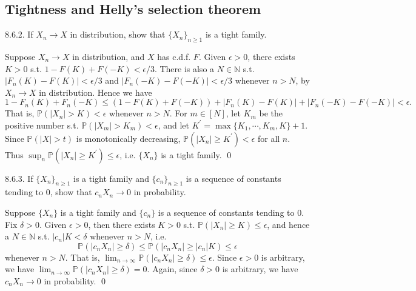 \subsection{Tightness and Helly’s selection theorem}
\begin{exercise}8.6.2. If $X_n\rightarrow X$ in distribution, show that $\{X_n\}_{n\geq1}$ is a tight family.
\end{exercise}
\begin{answer}
Suppose $X_n\rightarrow X$ in distribution, and $X$ has c.d.f. $F$. Given $\epsilon>0$, there exists $K>0$ s.t. $1-F(K)+F(-K)<\epsilon/3$. There is also a $N\in\mathbb{N}$ s.t. $|F_n(K)-F(K)|<\epsilon/3$ and $|F_n(-K)-F(-K)|<\epsilon/3$ whenever $n>N$, by $X_n\rightarrow X$ in distribution. Hence we have
\begin{equation*}
    1-F_n(K)+F_n(-K)\leq (1-F(K)+F(-K))+|F_n(K)-F(K)|+|F_n(-K)-F(-K)|<\epsilon.
\end{equation*}
That is, $\mathbb{P}(|X_n|>K)<\epsilon$ whenever $n>N$. For $m\in[N]$, let $K_m$ be the positive number s.t. $\mathbb{P}(|X_m|>K_m)<\epsilon$, and let $K^\prime=\max\{K_1,\cdots,K_m,K\}+1$. Since $\mathbb{P}(|X|>t)$ is monotonically decreasing, $\mathbb{P}(|X_n|\geq K^\prime)<\epsilon$ for all $n$. Thus $\sup_n \mathbb{P}(|X_n|\geq K^{\prime})\leq \epsilon$, i.e. $\{X_n\}$ is a tight family. \qed \qquad
\end{answer}

\begin{exercise}8.6.3. If $\{X_n\}_{n\geq1}$ is a tight family and $\{c_n\}_{n\geq1}$ is a sequence of constants tending to $0$, show that $c_nX_n \rightarrow 0$ in probability.
\end{exercise}
\begin{answer} Suppose $\{X_n\}$ is a tight family and $\{c_n\}$ is a sequence of constants tending to $0$. Fix $\delta>0$. Given $\epsilon>0$, then there exists $K>0$ s.t. $\mathbb{P}(|X_n|\geq K)\leq\epsilon$, and hence a $N\in\mathbb{N}$ s.t. $|c_n|K<\delta$ whenever $n>N$, i.e.
\begin{equation*}
    \mathbb{P}(|c_nX_n|\geq\delta)\leq\mathbb{P}(|c_nX_n|\geq|c_n|K)\leq\epsilon
\end{equation*}
whenever $n>N$. That is, $\lim_{n\rightarrow\infty}\mathbb{P}(|c_nX_n|\geq\delta)\leq\epsilon$. Since $\epsilon>0$ is arbitrary, we have $\lim_{n\rightarrow\infty}\mathbb{P}(|c_nX_n|\geq\delta)=0$. Again, since $\delta>0$ is arbitrary, we have $c_nX_n\rightarrow 0$ in probability.
\qed\qquad
\end{answer}

